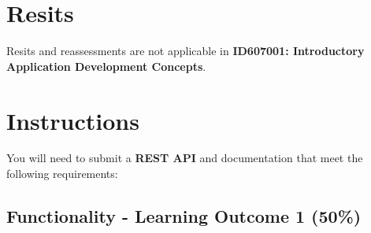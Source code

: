 \documentclass{article}
\begin{document}
\section*{Resits}
Resits and reassessments are not applicable in \textbf{ID607001: Introductory Application Development Concepts}. 

\newpage

\section*{Instructions}
You will need to submit a \textbf{REST API} and documentation that meet the following requirements: 

\subsection*{Functionality - Learning Outcome 1 (50\%)}
\end{document}
